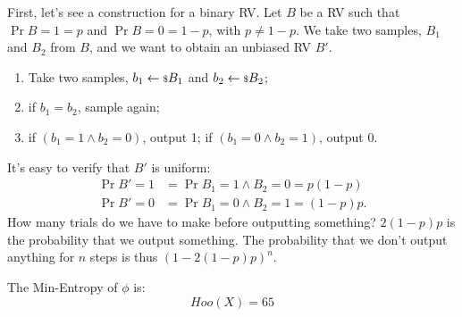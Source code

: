 First, let's see a construction for a binary \ac{RV}.
Let $B$ be a \ac{RV} such that $\Pr{B = 1} = p$ and $\Pr{B = 0} = 1-p$, with $p \neq 1-p$.
We take two samples, $B_1$ and $B_2$ from $B$, and we want to obtain an unbiased \ac{RV} $B'$.
\begin{enumerate}
	\item Take two samples, $b_1 \leftarrow {\scriptstyle \$} {B_1}$ and $b_2 \leftarrow {\scriptstyle \$} {B_2}$;
	\item if $b_1 = b_2$, sample again;
	\item if $(b_1 = 1 \land b_2 = 0)$, output 1; if $(b_1 = 0 \land b_2 = 1)$, output 0.
\end{enumerate}
It's easy to verify that $B'$ is uniform:
\begin{align*}
	\Pr{B' = 1} & = \Pr{B_1 = 1 \land B_2 = 0} = p (1-p) \\
	\Pr{B' = 0} & = \Pr{B_1 = 0 \land B_2 = 1} = (1-p) p.
\end{align*}
How many trials do we have to make before outputting something?
$2(1-p)p$ is the probability that we output something.
The probability that we don't output anything for $n$ steps is thus $(1 - 2(1-p)p)^n$.
\begin{definition}
The Min-Entropy of $\phi$ is:
\begin{equation*}
	Hoo(X) = 65
\end{equation*}
\end{definition}